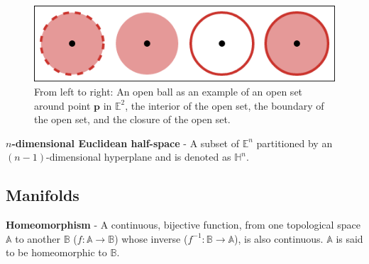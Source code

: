 \begin{figure}[t]
  \centering
  \includegraphics[width=.75\textwidth]{figs/chap2/openSet}
  \caption[Open ball as an example of an open set]{From left to right: An open
  ball as an example of an open set around point
  $\mathbf{p}$ in $\mathbb{E}^2$, the interior of the open set, the boundary of
  the open set, and the closure of the open set.}
  \label{fig:sets}
\end{figure}


\begin{defn}
  \textbf{$n$-dimensional Euclidean half-space} - A subset of $\mathbb{E}^n$
  partitioned by an $(n-1)$-dimensional hyperplane and is denoted
  as $\mathbb{H}^n$.
\end{defn}



\subsection{Manifolds}

\begin{defn}
  \textbf{Homeomorphism} - A continuous, bijective function, from one
  topological space $\mathbb{A}$ to another $\mathbb{B}$ ($f :\mathbb{A}
  \rightarrow \mathbb{B}$) whose inverse ($f^{-1}: \mathbb{B}
  \rightarrow \mathbb{A}$), is also continuous.
  $\mathbb{A}$ is said to be homeomorphic to $\mathbb{B}$.
\end{defn}

